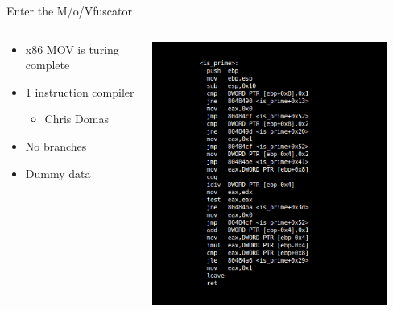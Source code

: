 \documentclass[10pt, compress]{beamer}
\begin{document}
\begin{frame}{Enter the M/o/Vfuscator}
  \begin{columns}
		\begin{column}{0.6\textwidth}
			\begin{itemize}
    \item x86 MOV is turing complete
    \item 1 instruction compiler
      \begin{itemize}
	  \item Chris Domas
	  \end{itemize}
    \item No branches
    \item Dummy data
  \end{itemize}
		\end{column}
		\begin{column}{0.4\textwidth}
			\includegraphics[width=0.9\textwidth]{images/gcc_asm.png}
			\linebreak
			\linebreak

\end{column}
\end{columns}
\end{frame}
\end{document}
